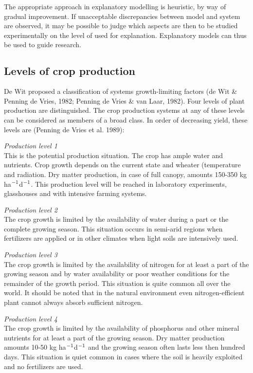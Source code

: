 The appropriate approach in explanatory modelling is heuristic, by way of gradual
improvement. If unacceptable discrepancies between model and system are observed,
it may be possible to judge which aspects are then to be studied experimentally on
the level of used for explanation. Explanatory models can thus be used to guide
research.

\subsection{Levels of crop production}
De Wit proposed a classification of systems growth-limiting factors (de Wit \&
Penning de Vries, 1982; Penning de Vries \& van Laar, 1982). Four levels of plant
production are distinguished. The crop production systems at any of these levels can
be considered as members of a broad class. In order of decreasing yield, these levels
are (Penning de Vries et al. 1989):

{\it Production level 1\/}\\
This is the potential production situation. The crop has ample water and nutrients.
Crop growth depends on the current state and wheater (temperature and radiation.
Dry matter production, in case of full canopy, amounts 150-350 kg ha$^{{\rm -1}}$d$^{{\rm -1}}$. This
production level will be reached in laboratory experiments, glasshouses and with
intensive farming systems.

{\it Production level 2\/}\\
The crop growth is limited by the availability of water during a part or the complete
growing season. This situation occurs in semi-arid regions when fertilizers are applied
or in other climates when light soils are intensively used.

{\it Production level 3\/}\\
The crop growth is limited by the availability of nitrogen for at least a part of the
growing season and by water availability or poor weather conditions for the remainder
of the growth period. This situation is quite common all over the world. It should be
noted that in the natural environment even nitrogen-efficient plant cannot always
absorb sufficient nitrogen.

{\it Production level 4\/}\\
The crop growth is limited by the availability of phosphorus and other mineral
nutrients for at least a part of the growing season. Dry matter production amounts
10-50 kg ha$^{{\rm -1}}$d$^{{\rm -1}}$ and the growing season often lasts less then hundred days. This
situation is quiet common in cases where the soil is heavily exploited and no fertilizers are used. 

